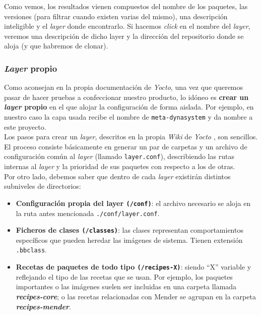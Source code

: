 Como vemos, los resultados vienen compuestos del nombre de los paquetes, las versiones (para filtrar cuando existen varias del mismo), una descripción inteligible y el \textit{layer} donde encontrarlo. Si hacemos \textit{click} en el nombre del \textit{layer}, veremos una descripción de dicho layer y la dirección del repositorio donde se aloja (y que habremos de clonar).\\

\subsubsection{\textit{Layer} propio}

Como aconsejan en la propia documentación de \textit{Yocto}, una vez que queremos pasar de hacer pruebas a confeccionar nuestro producto, lo idóneo es \textbf{crear un \textit{layer} propio} en el que alojar la configuración de forma aislada. Por ejemplo, en nuestro caso la capa usada recibe el nombre de \texttt{meta-dynasystem} y da nombre a este proyecto.\\

Los pasos para crear un \textit{layer}, descritos en la propia \textit{Wiki} de \textit{Yocto} \cite{wiki-yocto-own-layer}, son sencillos. El proceso consiste básicamente en generar un par de carpetas y un archivo de configuración común al \textit{layer} (llamado \texttt{layer.conf}), describiendo las rutas internas al \textit{layer} y la prioridad de sus paquetes con respecto a los de otras.\\

Por otro lado, debemos saber que dentro de cada \textit{layer} existirán distintos subniveles de directorios: 

\begin{itemize}
	\item \textbf{Configuración propia del layer \texttt{(/conf)}}: el archivo necesario se aloja en la ruta antes mencionada \texttt{./conf/layer.conf}.
	\item \textbf{Ficheros de clases \texttt{(/classes)}}: las clases representan comportamientos específicos que pueden heredar las imágenes de sistema. Tienen extensión \texttt{.bbclass}.
	\item \textbf{Recetas de paquetes de todo tipo \texttt{(/recipes-X)}}: siendo ``X'' variable y reflejando el tipo de las recetas que se usan. Por ejemplo, los paquetes importantes o las imágenes suelen ser incluidas en una carpeta llamada \textbf{\textit{recipes-core}}; o las recetas relacionadas con Mender se agrupan en la carpeta \textbf{\textit{recipes-mender}}.
\end{itemize}


